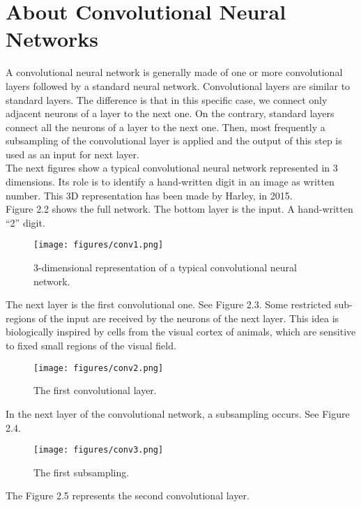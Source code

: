 \section{About Convolutional Neural Networks}

A convolutional neural network is generally made of one or more convolutional layers followed by a standard neural network.
Convolutional layers are similar to standard layers. The difference is that in this specific case, we connect only adjacent neurons of a layer to the next one. On the contrary, standard layers connect all the neurons of a layer to the next one. Then, most frequently a subsampling of the convolutional layer is applied and the output of this step is used as an input for next layer.\\

The next figures show a typical convolutional neural network represented in 3 dimensions. Its role is to identify a hand-written digit in an image as written number. This 3D representation has been made by Harley, in 2015.\\

Figure 2.2 shows the full network. The bottom layer is the input. A hand-written \enquote{2} digit.


\begin{figure}[!ht]
  \centering
  \texttt{[image: figures/conv1.png]}  
  \caption[3-dimensional representation of a typical convolutional neural network.]{3-dimensional representation of a typical convolutional neural network.}
  \protect\label{fig:conv1}
\end{figure}
\FloatBarrier

The next layer is the first convolutional one. See Figure 2.3. Some restricted sub-regions of the input are received by the neurons of the next layer. This idea is biologically inspired by cells from the visual cortex of animals, which are sensitive to fixed small regions of the visual field. 

\begin{figure}[!ht]
  \centering
  \texttt{[image: figures/conv2.png]}  
  \caption[The first convolutional layer.]{The first convolutional layer.}
  \protect\label{fig:conv2}
\end{figure}
\FloatBarrier
In the next layer of the convolutional network, a subsampling occurs. See Figure 2.4. 

\begin{figure}[!ht]
  \centering
  \texttt{[image: figures/conv3.png]}  
  \caption[The first subsampling.]{The first subsampling.}
  \protect\label{fig:conv3}
\end{figure}
\FloatBarrier
The Figure 2.5 represents the second convolutional layer.

